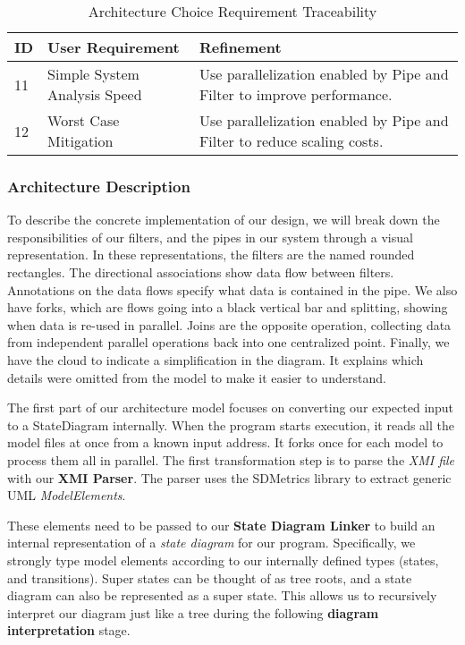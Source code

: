 \begin{table}[htbp]
    \centering
    \caption{Architecture Choice Requirement Traceability}\label{tab:arch-choice-table}
    \begin{tabularx}{\textwidth}{| l | l | X |}
        \hline
        \textbf{ID} & \textbf{User Requirement} & \textbf{Refinement} \\
        \hline
        11 & Simple System Analysis Speed & Use parallelization enabled by Pipe and Filter to improve performance. \\ \hline
        12 & Worst Case Mitigation & Use parallelization enabled by Pipe and Filter to reduce scaling costs.  \\ \hline
    \end{tabularx}
\end{table}

\newpage
\subsubsection{Architecture Description}\label{subsubsec:arch-desc}
To describe the concrete implementation of our design,
we will break down the responsibilities of our filters, and the pipes in our system through a visual representation.
In these representations, the filters are the named rounded rectangles.
The directional associations show data flow between filters.
Annotations on the data flows specify what data is contained in the pipe.
We also have forks, which are flows going into a black vertical bar and splitting, showing when data is re-used in parallel.
Joins are the opposite operation, collecting data from independent parallel operations back into one centralized point.
Finally, we have the cloud to indicate a simplification in the diagram.
It explains which details were omitted from the model to make it easier to understand.

The first part of our architecture model focuses on converting our expected input to a StateDiagram internally.
When the program starts execution, it reads all the model files at once from a known input address.
It forks once for each model to process them all in parallel.
The first transformation step is to parse the \textit{XMI file} with our \textbf{XMI Parser}.
The parser uses the SDMetrics library to extract generic UML \textit{ModelElements}.

These elements need to be passed to our \textbf{State Diagram Linker}
to build an internal representation of a \textit{state diagram} for our program.
Specifically, we strongly type model elements according to our internally defined types (states, and transitions).
Super states can be thought of as tree roots, and a state diagram can also be represented as a super state.
This allows us to recursively interpret our diagram just like a tree during the following \textbf{diagram interpretation} stage.

